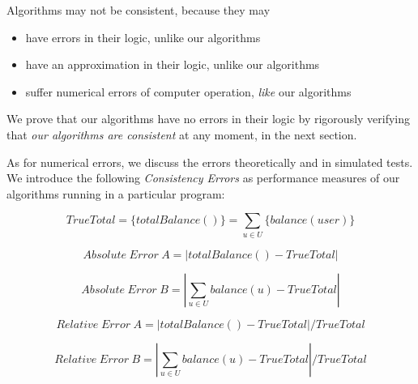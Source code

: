 \documentclass{article}
\begin{document}
Algorithms may not be consistent, because they may 
\begin{itemize}
  \item have errors in their logic, unlike our algorithms
  \item have an approximation in their logic, unlike our algorithms
  \item suffer numerical errors of computer operation, \textit{like} 
  our algorithms
\end{itemize}

We prove that our algorithms have no errors in their logic by rigorously 
verifying that \textit{our algorithms are consistent} at any moment, 
in the next section.

As for numerical errors, we discuss the errors theoretically and in 
simulated tests.
We introduce the following \textit{Consistency Errors} as performance measures 
of our algorithms running in a particular program:

  \begin{equation} \label{eq:TrueTotal}
    TrueTotal = \{totalBalance()\} = \sum_{u \in U} \{balance(user)\}
  \end{equation}

  \begin{equation}  \label{eq:AbsoluteErrorA}
    Absolute \hspace{3pt} Error \hspace{3pt} A = |totalBalance() - TrueTotal|
  \end{equation}

  \begin{equation}  \label{eq:AbsoluteErrorB}
    Absolute \hspace{3pt} Error \hspace{3pt} B = |\sum_{u \in U} balance(u) - TrueTotal|
  \end{equation}

  \begin{equation}  \label{eq:RelativeErrorA}
    Relative \hspace{3pt} Error \hspace{3pt} A = |totalBalance() - TrueTotal| / TrueTotal
  \end{equation}

  \begin{equation}  \label{eq:RelativeErrorB}
    Relative \hspace{3pt} Error \hspace{3pt} B = |\sum_{u \in U} balance(u) - TrueTotal| / TrueTotal
  \end{equation}
\end{document}
